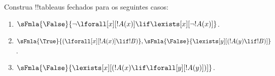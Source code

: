 \documentclass[../../../include/open-logic-section]{subfiles}
\begin{document}
\begin{prob}
Construa !!{tableau}s fechados para os seguintes casos:
\begin{enumerate}
\item $\sFmla{\False}{\lnot\lforall[x][!A(x)] \lif \lexists[x][\lnot!A(x)]}$.
\item $\sFmla{\True}{(\lforall[x][!A(x)] \lif !B)}, \sFmla{\False}{\lexists[y][(!A(y) \lif !B)]}$.
\item $\sFmla{\False}{\lexists[x][(!A(x) \lif \lforall[y][!A(y)])]}$.
\end{enumerate}
\end{prob}
\end{document}
